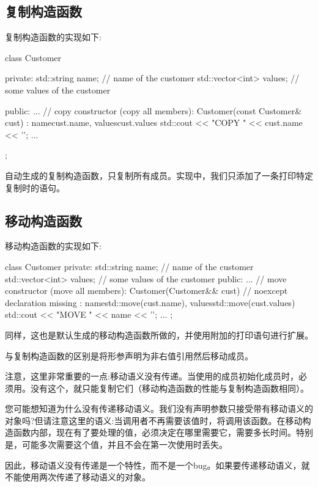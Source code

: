 \subsection{复制构造函数}

复制构造函数的实现如下:

\begin{cppcode}
class Customer {
private:
	std::string name; // name of the customer
	std::vector<int> values; // some values of the customer

public:
	...
	// copy constructor (copy all members):
	Customer(const Customer& cust)
	: name{cust.name}, values{cust.values} {
		std::cout << "COPY " << cust.name << '\n';
	}
	...
};
\end{cppcode}

自动生成的复制构造函数，只复制所有成员。实现中，我们只添加了一条打印特定复制时的语句。

\subsection{移动构造函数}

移动构造函数的实现如下:

\begin{cppcode}
class Customer {
private:
	std::string name; // name of the customer
	std::vector<int> values; // some values of the customer
public:
	...
	// move constructor (move all members):
	Customer(Customer&& cust) // noexcept declaration missing
	: name{std::move(cust.name)}, values{std::move(cust.values)} {
		std::cout << "MOVE " << name << '\n';
	}
	...
};
\end{cppcode}

同样，这也是默认生成的移动构造函数所做的，并使用附加的打印语句进行扩展。

与复制构造函数的区别是将形参声明为非右值引用然后移动成员。

注意，这里非常重要的一点:移动语义没有传递。当使用的成员初始化成员时，必须用。没有这个，就只能复制它们（移动构造函数的性能与复制构造函数相同）。

您可能想知道为什么没有传递移动语义。我们没有声明参数只接受带有移动语义的对象吗?但请注意这里的语义:当调用者不再需要该值时，将调用该函数。在移动构造函数内部，现在有了要处理的值，必须决定在哪里需要它，需要多长时间。特别是，可能多次需要这个值，并且不会在第一次使用时丢失。

因此，移动语义没有传递是一个特性，而不是一个bug。如果要传递移动语义，就不能使用两次传递了移动语义的对象。


